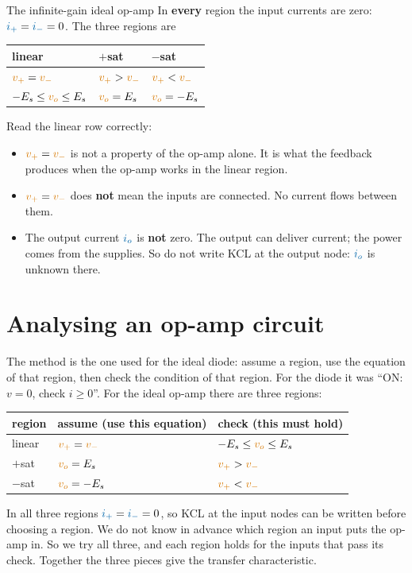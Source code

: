 \documentclass[11pt,a4paper]{article}
\newcommand{\Icol}[1]{\textcolor{ccur}{#1}}
\newcommand{\Vcol}[1]{\textcolor{cvolt}{#1}}
\newcommand{\vo}{\Vcol{v_o}}
\newcommand{\vp}{\Vcol{v_+}}
\newcommand{\vm}{\Vcol{v_-}}
\newcommand{\ip}{\Icol{i_+}}
\newcommand{\im}{\Icol{i_-}}
\newcommand{\Es}{E_s}
\begin{document}
\begin{definitionbox}{The infinite-gain ideal op-amp}
In \textbf{every} region the input currents are zero: $\ip = \im = 0$. The three regions are
\begin{center}
\renewcommand{\arraystretch}{1.3}
\begin{tabular}{@{}lll@{}}
\toprule
linear & $+$sat & $-$sat\\
\midrule
$\vp = \vm$ & $\vp > \vm$ & $\vp < \vm$\\
$-\Es \leq \vo \leq \Es$ & $\vo = \Es$ & $\vo = -\Es$\\
\bottomrule
\end{tabular}
\end{center}
\end{definitionbox}

Read the linear row correctly:
\begin{itemize}
  \item $\vp = \vm$ is not a property of the op-amp alone. It is what the feedback produces when
        the op-amp works in the linear region.
  \item $\vp = \vm$ does \textbf{not} mean the inputs are connected. No current flows between
        them.
  \item The output current $\Icol{i_o}$ is \textbf{not} zero. The output can deliver current;
        the power comes from the supplies. So do not write KCL at the output node: $\Icol{i_o}$ is
        unknown there.
\end{itemize}

\section{Analysing an op-amp circuit}

The method is the one used for the ideal diode: assume a region, use the equation of that
region, then check the condition of that region. For the diode it was ``ON: $v = 0$, check
$i \geq 0$''. For the ideal op-amp there are three regions:

\begin{center}
\renewcommand{\arraystretch}{1.35}
\begin{tabular}{@{}lll@{}}
\toprule
region & assume (use this equation) & check (this must hold)\\
\midrule
linear & $\vp = \vm$ & $-\Es \leq \vo \leq \Es$\\
$+$sat & $\vo = \Es$ & $\vp > \vm$\\
$-$sat & $\vo = -\Es$ & $\vp < \vm$\\
\bottomrule
\end{tabular}
\end{center}
In all three regions $\ip = \im = 0$, so KCL at the input nodes can be written before choosing a
region. We do not know in advance which region an input puts the op-amp in. So we try all three,
and each region holds for the inputs that pass its check. Together the three pieces give the
transfer characteristic.
\end{document}
